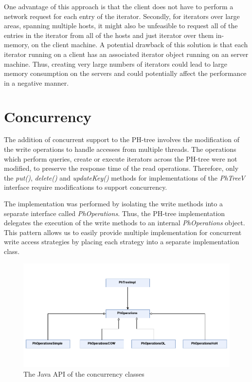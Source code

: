 \documentclass[11pt,a4paper]{globis-book}
\begin{document}
One advantage of this approach is that the client does not have to perform a network request for each entry of the iterator. Secondly, for iterators over large areas, spanning multiple hosts, it might also be unfeasible to request all of the entries in the iterator from all of the hosts and just iterator over them in-memory, on the client machine. A potential drawback of this solution is that each iterator running on a client has an associated iterator object running on an server machine. Thus, creating very large numbers of iterators could lead to large memory consumption on the servers and could potentially affect the performance in a negative manner.

\section{Concurrency}

The addition of concurrent support to the PH-tree involves the modification of the write operations to handle accesses from multiple threads. The operations which perform queries, create or execute iterators across the PH-tree were not modified, to preserve the response time of the read operations. Therefore, only the \textit{put()}, \textit{delete()} and \textit{updateKey()} methods for implementations of the \textit{PhTreeV} interface require modifications to support concurrency. 

The implementation was performed by isolating the write methods into a separate interface called \textit{PhOperations}. Thus, the PH-tree implementation delegates the execution of the write methods to an internal \textit{PhOperations} object. This pattern allows us to easily provide multiple implementation for concurrent write access strategies by placing each strategy into a separate implementation class. 

\begin{figure}[h]
    \centering 
    \includegraphics[scale=1]{images/PH-tree-concurrency}
    \caption{The Java API of the concurrency classes}
    \label{fig:Concurrency-classes}
\end{figure}
\end{document}
